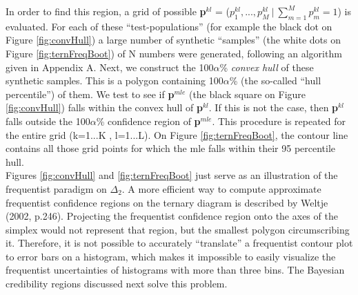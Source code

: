 \documentclass{article}
\begin{document}
In order  to find  this region,  a grid of  possible {\bf  p}$^{kl}$ =
($p_1^{kl},...  ,p_M^{kl} ~|~ \sum_{m=1}^Mp_m^{kl} = 1$) is evaluated.
For each of  these ``test-populations'' (for example the  black dot on
Figure  \ref{fig:convHull}) a  large number  of  synthetic ``samples''
(the white  dots on Figure  \ref{fig:ternFreqBoot}) of N  numbers were
generated,  following an  algorithm  given in  Appendix  A.  Next,  we
construct  the  100$\alpha$\% {\it  convex  hull}  of these  synthetic
samples.  This  is a  polygon containing 100$\alpha$\%  (the so-called
``hull percentile'') of them.  We  test to see if {\bf p}$^{mle}$ (the
black  square on  Figure \ref{fig:convHull})  falls within  the convex
hull of {\bf  p}$^{kl}$. If this is not the  case, then {\bf p}$^{kl}$
falls   outside   the   100$\alpha$\%   confidence  region   of   {\bf
p}$^{mle}$. This procedure is repeated  for the entire grid (k=1...K ,
l=1...L).  On Figure \ref{fig:ternFreqBoot}, the contour line contains
all  those  grid  points for  which  the  mle  falls within  their  95
percentile hull.\\

Figures \ref{fig:convHull} and \ref{fig:ternFreqBoot} just serve as an
illustration  of  the  frequentist  paradigm on  $\Delta_2$.   A  more
efficient way to compute approximate frequentist confidence regions on
the ternary diagram is  described by Weltje (2002, p.246).  Projecting
the frequentist confidence  region onto the axes of  the simplex would
not represent that region, but the smallest polygon circumscribing it.
Therefore,  it   is  not   possible  to  accurately   ``translate''  a
frequentist contour plot to error  bars on a histogram, which makes it
impossible  to  easily  visualize  the  frequentist  uncertainties  of
histograms with more than three bins. The Bayesian credibility regions
discussed next solve this problem.
\end{document}
